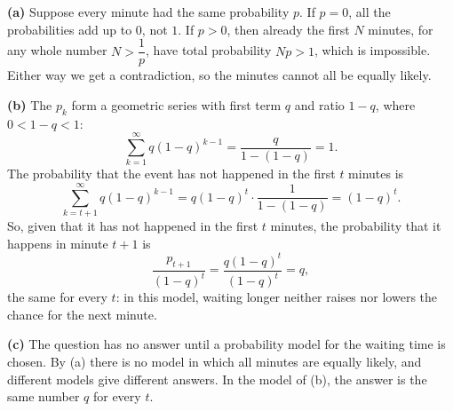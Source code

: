 \textbf{(a)} Suppose every minute had the same probability $p$. If $p=0$, all the probabilities add up to $0$, not $1$. If $p>0$, then already the first $N$ minutes, for any whole number $N>\dfrac1p$, have total probability $Np>1$, which is impossible. Either way we get a contradiction, so the minutes cannot all be equally likely.

\textbf{(b)} The $p_k$ form a geometric series with first term $q$ and ratio $1-q$, where $0<1-q<1$:
\[\sum_{k=1}^{\infty}q(1-q)^{k-1}=\dfrac{q}{1-(1-q)}=1.\]
The probability that the event has not happened in the first $t$ minutes is
\[\sum_{k=t+1}^{\infty}q(1-q)^{k-1}=q(1-q)^t\cdot\dfrac{1}{1-(1-q)}=(1-q)^t.\]
So, given that it has not happened in the first $t$ minutes, the probability that it happens in minute $t+1$ is
\[\dfrac{p_{t+1}}{(1-q)^t}=\dfrac{q(1-q)^t}{(1-q)^t}=\boxed{q},\]
the same for every $t$: in this model, waiting longer neither raises nor lowers the chance for the next minute.

\textbf{(c)} The question has no answer until a probability model for the waiting time is chosen. By (a) there is no model in which all minutes are equally likely, and different models give different answers. In the model of (b), the answer is the same number $q$ for every $t$.
